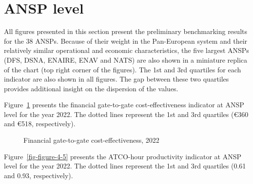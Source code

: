 \documentclass[
  letterpaper,
  DIV=11,
  numbers=noendperiod]{scrreprt}
\begin{document}
\newpage{}

\section{ANSP level}\label{sec-fin_2}

All figures presented in this section present the preliminary
benchmarking results for the 38 ANSPs. Because of their weight in the
Pan-European system and their relatively similar operational and
economic characteristics, the five largest ANSPs (DFS, DSNA, ENAIRE,
ENAV and NATS) are also shown in a miniature replica of the chart (top
right corner of the figures). The 1st and 3rd quartiles for each
indicator are also shown in all figures. The gap between these two
quartiles provides additional insight on the dispersion of the values.

Figure~\ref{fig-figure-4-4} presents the financial gate-to-gate
cost-effectiveness indicator at ANSP level for the year 2022. The dotted
lines represent the 1st and 3rd quartiles (€360 and €518, respectively).

\hfill\break

\begin{figure}[h]


\caption{\label{fig-figure-4-4}Financial gate-to-gate
cost-effectiveness, 2022}

\end{figure}%

\newpage{}

Figure~\ref{fig-figure-4-5} presents the ATCO-hour productivity
indicator at ANSP level for the year 2022. The dotted lines represent
the 1st and 3rd quartiles (0.61 and 0.93, respectively).
\end{document}

